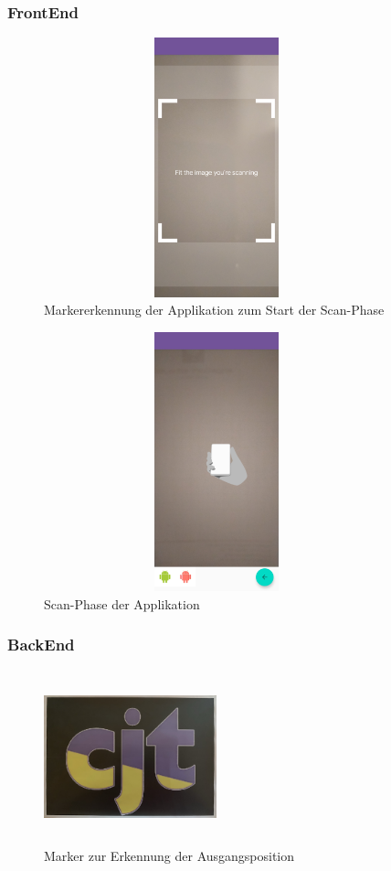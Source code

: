 \subsubsection{FrontEnd}
\begin{figure}[hbt!]
    \centering
    \includegraphics[width=10cm,height=7.5cm,keepaspectratio]{4Umsetzung/Bilder/image_tracking.jpg}
    \caption{Markererkennung der Applikation zum Start der Scan-Phase}
    \label{pic:image_tracking}
\end{figure}
\begin{figure}[hbt!]
    \centering
    \includegraphics[width=10cm,height=7.5cm,keepaspectratio]{4Umsetzung/Bilder/scan-phase.jpg}
    \caption{Scan-Phase der Applikation}
    \label{pic:scan}
\end{figure}
\subsubsection{BackEnd}
\begin{figure}[hbt!]
    \centering
    \includegraphics[width=5cm,height=5cm,keepaspectratio]{4Umsetzung/Bilder/cjt_logo_tracking.png}
    \caption{Marker zur Erkennung der Ausgangsposition}
    \label{pic:initialMarker}
\end{figure}


